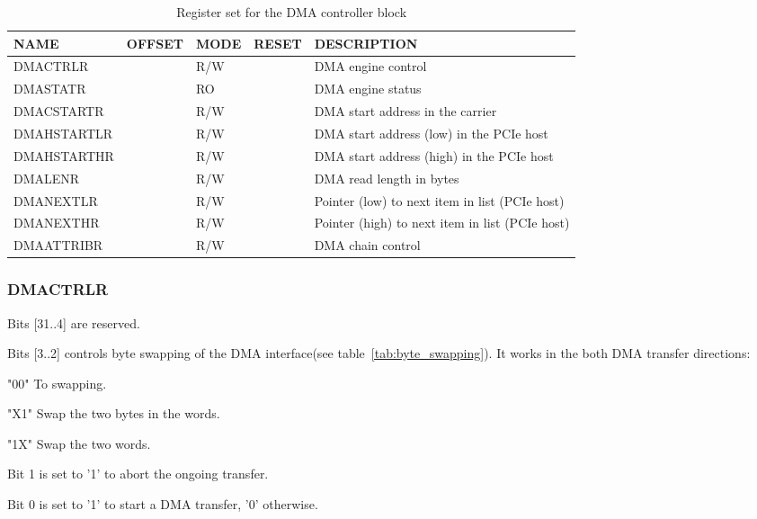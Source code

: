 \documentclass[10pt,a4paper]{cerndoc}
\begin{document}
\begin{table}[htbp]
  \centering
  \begin{tabularx}{\textwidth}{|l|r|l|l|X|}                                                   \hline
    \textbf{NAME}  & \textbf{OFFSET} & \textbf{MODE} & \textbf{RESET} & \textbf{DESCRIPTION}  \\ \hline \hline
    DMACTRLR       & & R/W & & DMA engine control                                             \\ \hline
    DMASTATR       & & RO  & & DMA engine status                                              \\ \hline
    DMACSTARTR     & & R/W & & DMA start address in the carrier                               \\ \hline
    DMAHSTARTLR    & & R/W & & DMA start address (low) in the PCIe host                       \\ \hline
    DMAHSTARTHR    & & R/W & & DMA start address (high) in the PCIe host                      \\ \hline
    DMALENR        & & R/W & & DMA read length in bytes                                       \\ \hline
    DMANEXTLR      & & R/W & & Pointer (low) to next item in list (PCIe host)                 \\ \hline
    DMANEXTHR      & & R/W & & Pointer (high) to next item in list (PCIe host)                \\ \hline
    DMAATTRIBR     & & R/W & & DMA chain control                                              \\ \hline
  \end{tabularx}
  \caption{Register set for the DMA controller block}
  \label{tab:dma_control}
\end{table}


\newpage
\subsubsection{DMACTRLR}
\begin{packed_item}
\item Bits [31..4] are reserved.
\item Bits [3..2] controls byte swapping of the DMA interface(see table~\ref{tab:byte_swapping}). It works in the both DMA transfer directions:
  \begin{packed_item}
    \item "00" To swapping.
    \item "X1" Swap the two bytes in the words.
    \item "1X" Swap the two words.
  \end{packed_item}
\item Bit 1 is set to '1' to abort the ongoing transfer.
\item Bit 0 is set to '1' to start a DMA transfer, '0' otherwise.
\end{packed_item}
\end{document}
